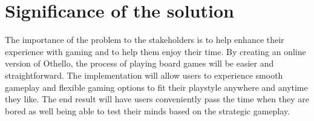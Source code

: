 \documentclass{article}
\begin{document}
\section{Significance of the solution}

The importance of the problem to the stakeholders is to help enhance their experience with gaming and to help them enjoy their time. By creating an online version of Othello, the process of playing board games will be easier and straightforward. The implementation will allow users to experience smooth gameplay and flexible gaming options to fit their playstyle anywhere and anytime they like. The end result will have users conveniently pass the time when they are bored as well being able to test their minds based on the strategic gameplay.






\end{document}
